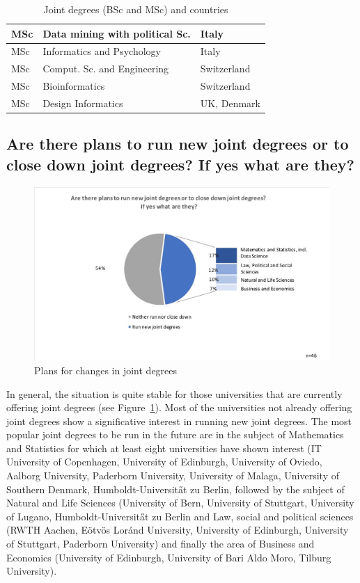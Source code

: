 \begin{table}
\begin{center}
\begin{tabular}  {|l|l|l|}
\hline
MSc & Data mining with political Sc.  &  Italy\\
\hline
MSc&  Informatics and Psychology   &  Italy\\
\hline
MSc & Comput. Sc. and Engineering & Switzerland\\
\hline
MSc& Bioinformatics  & Switzerland\\
\hline
MSc & Design Informatics    & UK, Denmark\\
\hline
\end{tabular}
\vspace*{.4cm}
\caption{Joint degrees (BSc and MSc) and countries}
\end{center}
\label{ sect3:titles}
\end{table}


\subsection{Are there plans to run new joint degrees or to close down joint degrees? If yes what are they?}

\begin{figure}[h]
\includegraphics[width = \linewidth]{charts/2b.jpg}
\caption{Plans for changes in joint degrees}
\label{sect3:change}
\end{figure}

In general, the situation is  quite stable for those universities that are currently offering joint degrees (see Figure~\ref{sect3:change}). Most of the universities not already offering joint degrees show a significative interest in running new joint degrees. The most popular joint degrees to be run in the future are in the subject of Mathematics and Statistics for which at least eight universities have shown interest (IT University of Copenhagen, University of Edinburgh, University of Oviedo, Aalborg University, Paderborn University, University of Malaga, University of Southern Denmark, Humboldt-Universit\H at zu Berlin, followed by the subject of 
Natural and Life Sciences (University of Bern, University of Stuttgart, University of Lugano, Humboldt-Universit\H at zu Berlin and 
Law, social and political sciences (RWTH Aachen, E\" otv\"os Lor\'and University, University of Edinburgh, University of Stuttgart, Paderborn University) and finally the area of  Business and Economics (University of Edinburgh, University of Bari Aldo Moro, Tilburg University). 

